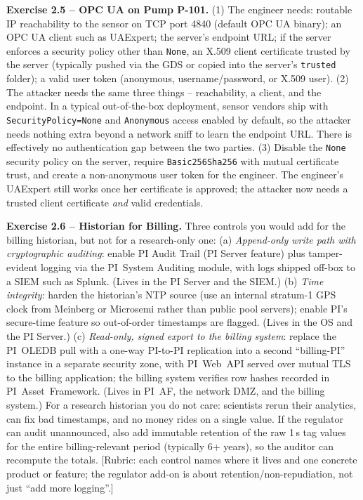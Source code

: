 \documentclass[11pt,a4paper]{article}
\begin{document}
\begin{solutionbox}
\textbf{Exercise 2.5 -- OPC UA on Pump P-101.}
(1) The engineer needs: routable IP reachability to the sensor on TCP
port 4840 (default OPC UA binary); an OPC UA client such as UAExpert; the
server's endpoint URL; if the server enforces a security policy other
than \texttt{None}, an X.509 client certificate trusted by the server
(typically pushed via the GDS or copied into the server's \texttt{trusted}
folder); a valid user token (anonymous, username/password, or X.509
user).
(2) The attacker needs the same three things -- reachability, a client,
and the endpoint. In a typical out-of-the-box deployment, sensor vendors
ship with \texttt{SecurityPolicy=None} and \texttt{Anonymous} access
enabled by default, so the attacker needs nothing extra beyond a network
sniff to learn the endpoint URL. There is effectively no authentication
gap between the two parties.
(3) Disable the \texttt{None} security policy on the server, require
\texttt{Basic256Sha256} with mutual certificate trust, and create a
non-anonymous user token for the engineer. The engineer's UAExpert still
works once her certificate is approved; the attacker now needs a trusted
client certificate \emph{and} valid credentials.
\end{solutionbox}

\begin{solutionbox}
\textbf{Exercise 2.6 -- Historian for Billing.}
Three controls you would add for the billing historian, but not for a
research-only one:
(a) \emph{Append-only write path with cryptographic auditing}: enable PI
Audit Trail (PI Server feature) plus tamper-evident logging via the
PI~System Auditing module, with logs shipped off-box to a SIEM such as
Splunk. (Lives in the PI Server and the SIEM.)
(b) \emph{Time integrity}: harden the historian's NTP source (use an
internal stratum-1 GPS clock from Meinberg or Microsemi rather than
public pool servers); enable PI's secure-time feature so out-of-order
timestamps are flagged. (Lives in the OS and the PI Server.)
(c) \emph{Read-only, signed export to the billing system}: replace the
PI~OLEDB pull with a one-way PI-to-PI replication into a second
``billing-PI'' instance in a separate security zone, with PI~Web~API
served over mutual TLS to the billing application; the billing system
verifies row hashes recorded in PI~Asset~Framework. (Lives in PI~AF, the
network DMZ, and the billing system.)
For a research historian you do not care: scientists rerun their
analytics, can fix bad timestamps, and no money rides on a single value.
If the regulator can audit unannounced, also add immutable retention of
the raw 1\,s tag values for the entire billing-relevant period
(typically 6+ years), so the auditor can recompute the totals.
[Rubric: each control names where it lives and one concrete product or
feature; the regulator add-on is about retention/non-repudiation, not
just ``add more logging''.]
\end{solutionbox}
\end{document}
